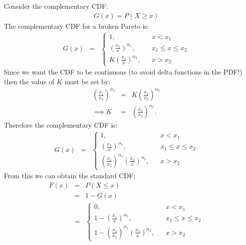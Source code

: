 \documentclass[letterpaper, 11pt]{article}
\begin{document}
Consider the complementary CDF:
\begin{eqnarray}
G(x) = P(X \geq x)
\end{eqnarray}
The complementary CDF for a broken Pareto is:
\begin{eqnarray}
G(x) &=&
\left\{
\begin{array}{lcr}
1, & & x < x_1 \\
\left(\frac{x_1}{x}\right)^{\alpha_1}, & & x_1 \leq x \leq x_2 \\
K\left(\frac{x_2}{x}\right)^{\alpha_2}, & & x > x_2
\end{array}
\right.
\end{eqnarray}
Since we want the CDF to be continuous (to avoid delta functions in the PDF!)
then the value of $K$ must be set by:
\begin{eqnarray}
\left(\frac{x_1}{x_2}\right)^{\alpha_1} &=& K\left(\frac{x_2}{x_2}\right)^{\alpha_2} \\
\implies K &=& \left(\frac{x_1}{x_2}\right)^{\alpha_1}.
\end{eqnarray}
Therefore the complementary CDF is:
\begin{eqnarray}
G(x) &=&
\left\{
\begin{array}{lcr}
1, & & x < x_1 \\
\left(\frac{x_1}{x}\right)^{\alpha_1}, & & x_1 \leq x \leq x_2 \\
\left(\frac{x_1}{x_2}\right)^{\alpha_1}\left(\frac{x_2}{x}\right)^{\alpha_2}, & & x > x_2
\end{array}
\right.
\end{eqnarray}
From this we can obtain the standard CDF:
\begin{eqnarray}
F(x) &=& P(X \leq x) \\
&=& 1 - G(x)\\
&=& \left\{
\begin{array}{lcr}
0, & & x < x_1 \\
1 - \left(\frac{x_1}{x}\right)^{\alpha_1}, & & x_1 \leq x \leq x_2 \\
1 - \left(\frac{x_1}{x_2}\right)^{\alpha_1}\left(\frac{x_2}{x}\right)^{\alpha_2}, & & x > x_2
\end{array}
\right.
\end{eqnarray}
\end{document}
